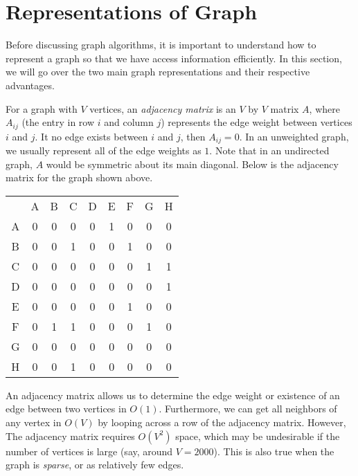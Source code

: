 \section{Representations of Graph}

Before discussing graph algorithms, it is important to understand how to represent a graph so that we have access information efficiently. In this section, we will go over the two main graph representations and their respective advantages.

For a graph with $V$ vertices, an \textit{adjacency matrix} is an $V$ by $V$ matrix $A$, where $A_{ij}$ (the entry in row $i$ and column $j$) represents the edge weight between vertices $i$ and $j$. It no edge exists between $i$ and $j$, then $A_{ij} = 0$. In an unweighted graph, we usually represent all of the edge weights as $1$. Note that in an undirected graph, $A$ would be symmetric about its main diagonal. Below is the adjacency matrix for the graph shown above. 

\begin{center}
\begin{minipage}{0.45\linewidth}
\begin{tabular}{c c c c c c c c c}
         & A & B & C & D & E & F & G & H \\
A        & 0 & 0 & 0 & 0 & 1 & 0 & 0 & 0 \\
B        & 0 & 0 & 1 & 0 & 0 & 1 & 0 & 0 \\
C        & 0 & 0 & 0 & 0 & 0 & 0 & 1 & 1 \\
D        & 0 & 0 & 0 & 0 & 0 & 0 & 0 & 1 \\
E        & 0 & 0 & 0 & 0 & 0 & 1 & 0 & 0 \\
F        & 0 & 1 & 1 & 0 & 0 & 0 & 1 & 0 \\
G        & 0 & 0 & 0 & 0 & 0 & 0 & 0 & 0 \\
H        & 0 & 0 & 1 & 0 & 0 & 0 & 0 & 0 \\
\end{tabular}
\end{minipage}
\end{center}

An adjacency matrix allows us to determine the edge weight or existence of an edge between two vertices in $O(1)$. Furthermore, we can get all neighbors of any vertex in $O(V)$ by looping across a row of the adjacency matrix. However, The adjacency matrix requires $O(V^2)$ space, which may be undesirable if the number of vertices is large (say, around $V = 2000$). This is also true when the graph is \textit{sparse}, or as relatively few edges. 

